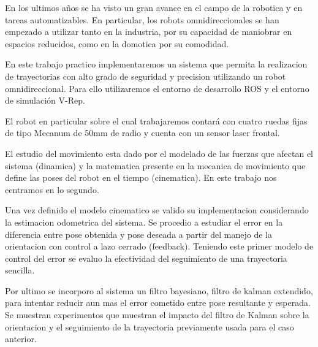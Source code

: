 En los ultimos años se ha visto un gran avance en el campo de la robotica y en tareas automatizables. En particular, los robots omnidireccionales se han empezado a utilizar tanto en la industria, por su capacidad de maniobrar en espacios reducidos, como en la domotica por su comodidad.

En este trabajo practico implementaremos un sistema que permita la realizacion de trayectorias con alto grado de seguridad y precision utilizando un robot omnidireccional. Para ello utilizaremos el entorno de desarrollo ROS y el entorno de simulación V-Rep.

El robot en particular sobre el cual trabajaremos contará con cuatro ruedas fijas de tipo Mecanum de 50mm de radio y cuenta con un sensor laser frontal. 

El estudio del movimiento esta dado por el modelado de las fuerzas que afectan el sistema (dinamica) y la matematica presente en la mecanica de movimiento que define las poses del robot en el tiempo (cinematica). En este trabajo nos centramos en lo segundo.

Una vez definido el modelo cinematico se valido su implementacion considerando la estimacion odometrica del sistema. Se procedio a estudiar el error en la diferencia entre pose obtenida y pose deseada a partir del manejo de la orientacion con control a lazo cerrado (feedback). Teniendo este primer modelo de control del error se evaluo la efectividad del seguimiento de una trayectoria sencilla.

Por ultimo se incorporo al sistema un filtro bayesiano, filtro de kalman extendido, para intentar reducir aun mas el error cometido entre pose resultante y esperada. Se muestran experimentos que muestran el impacto del filtro de Kalman sobre la orientacion y el seguimiento de la trayectoria previamente usada para el caso anterior.   



